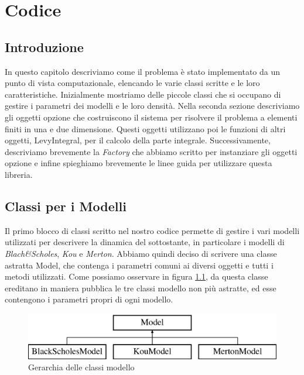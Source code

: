 \documentclass[a4paper,10pt]{report}
\theoremstyle{plain}
\theoremstyle{definition}
\theoremstyle{remark}
\begin{document}
\chapter{Codice}
\section{Introduzione}
In questo capitolo descriviamo come il problema \`e stato implementato da un punto di vista computazionale, elencando le varie classi scritte e le loro caratteristiche. Inizialmente mostriamo delle piccole classi che si occupano di gestire i parametri dei modelli e le loro densit\`a. Nella seconda sezione descriviamo gli oggetti opzione che costruiscono il sistema per risolvere il problema a elementi finiti in una e due dimensione. Questi oggetti utilizzano poi le funzioni di altri oggetti, \textsf{LevyIntegral}, per il calcolo della parte integrale. Successivamente, descriviamo brevemente la \emph{Factory} che abbiamo scritto per instanziare gli oggetti opzione e infine spieghiamo brevemente le linee guida per utilizzare questa libreria.
\section{Classi per i Modelli}
Il primo blocco di classi scritto nel nostro codice permette di gestire i vari modelli utilizzati per descrivere la dinamica del sottostante, in particolare i modelli di \emph{Blach\&Scholes}, \emph{Kou} e \emph{Merton}. Abbiamo quindi deciso di scrivere una classe astratta \textsf{Model}, che contenga i parametri comuni ai diversi oggetti e tutti i metodi utilizzati. Come possiamo osservare in figura \ref{modelbase}, da questa classe ereditano in maniera pubblica le tre classi modello non pi\`u astratte, ed esse contengono i parametri propri di ogni modello.
\begin{figure}[h!]
\begin{center}
\includegraphics[width=12cm]{img/classModel.eps}
\caption{Gerarchia delle classi modello}
\end{center}
\label{modelbase}
\end{figure}
\end{document}
